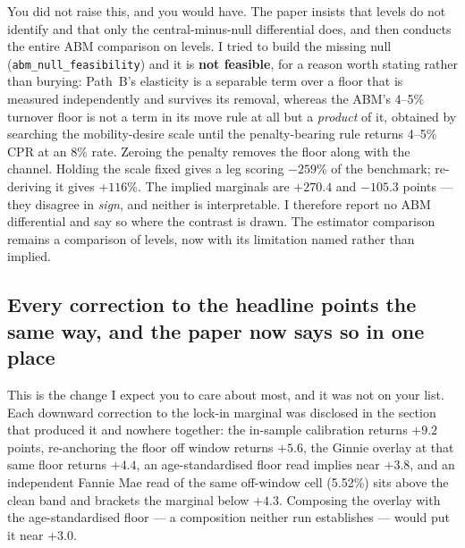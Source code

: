 \documentclass[11pt]{article}
\newcommand{\run}[1]{\texttt{#1}}
\begin{document}
You did not raise this, and you would have. The paper insists that levels do not
identify and that only the central-minus-null differential does, and then conducts the
entire ABM comparison on levels. I tried to build the missing null
(\run{abm\_null\_feasibility}) and it is \textbf{not feasible}, for a reason worth
stating rather than burying: Path~B's elasticity is a separable term over a floor that
is measured independently and survives its removal, whereas the ABM's 4--5\%
turnover floor is not a term in its move rule at all but a \emph{product} of it,
obtained by searching the mobility-desire scale until the penalty-bearing rule returns
4--5\% CPR at an 8\% rate. Zeroing the penalty removes the floor along with the
channel. Holding the scale fixed gives a leg scoring $-259$\% of the benchmark;
re-deriving it gives $+116$\%. The implied marginals are $+270.4$ and $-105.3$ points
--- they disagree in \emph{sign}, and neither is interpretable. I therefore report no
ABM differential and say so where the contrast is drawn. The estimator comparison
remains a comparison of levels, now with its limitation named rather than implied.

\subsection{Every correction to the headline points the same way, and the paper now
says so in one place}

This is the change I expect you to care about most, and it was not on your list. Each
downward correction to the lock-in marginal was disclosed in the section that produced
it and nowhere together: the in-sample calibration returns $+9.2$ points, re-anchoring
the floor off window returns $+5.6$, the Ginnie overlay at that same floor returns
$+4.4$, an age-standardised floor read implies near $+3.8$, and an independent Fannie
Mae read of the same off-window cell (5.52\%) sits above the clean band and brackets
the marginal below $+4.3$. Composing the overlay with the age-standardised floor ---
a composition neither run establishes --- would put it near $+3.0$.
\end{document}
